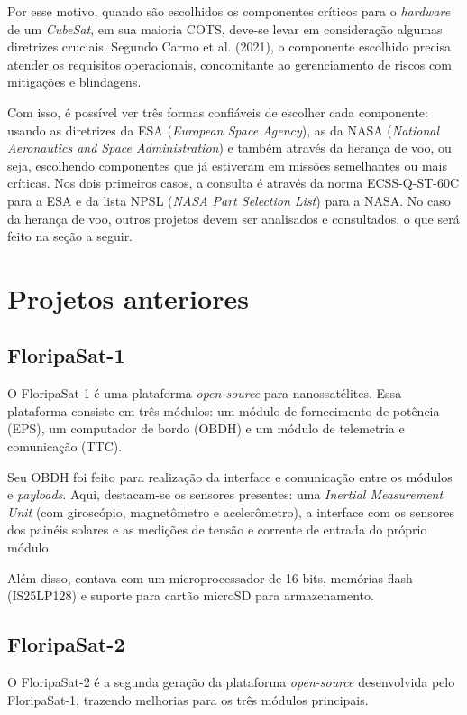 Por esse motivo, quando são escolhidos os componentes críticos para o \textit{hardware} de um \textit{CubeSat}, em sua maioria COTS, deve-se levar em consideração algumas diretrizes cruciais. Segundo Carmo et al. (2021), o componente escolhido precisa atender os requisitos operacionais, concomitante ao gerenciamento de riscos com mitigações e blindagens. 

Com isso, é possível ver três formas confiáveis de escolher cada componente: usando as diretrizes da ESA (\textit{European Space Agency}), as da NASA (\textit{National Aeronautics and Space Administration}) e também através da herança de voo, ou seja, escolhendo componentes que já estiveram em missões semelhantes ou mais críticas. Nos dois primeiros casos, a consulta é através da norma ECSS-Q-ST-60C para a ESA e da lista NPSL (\textit{NASA Part Selection List}) para a NASA.  No caso da herança de voo, outros projetos devem ser analisados e consultados, o que será feito na seção a seguir.

\section{Projetos anteriores}

\subsection{FloripaSat-1}
O FloripaSat-1 é uma plataforma \textit{open-source} para nanossatélites. Essa plataforma consiste em três módulos: um módulo de fornecimento de potência (EPS), um computador de bordo (OBDH) e um módulo de telemetria e comunicação (TTC).

Seu OBDH foi feito para realização da interface e comunicação entre os módulos e \textit{payloads}. Aqui, destacam-se os sensores presentes: uma \textit{Inertial Measurement Unit} (com giroscópio, magnetômetro e acelerômetro), a interface com os sensores dos painéis solares e as medições de tensão e corrente de entrada do próprio módulo.

Além disso, contava com um microprocessador de 16 bits, memórias flash (IS25LP128) e suporte para cartão microSD para armazenamento.

\subsection{FloripaSat-2}
O FloripaSat-2 é a segunda geração da plataforma \textit{open-source} desenvolvida pelo FloripaSat-1, trazendo melhorias para os três módulos principais.


